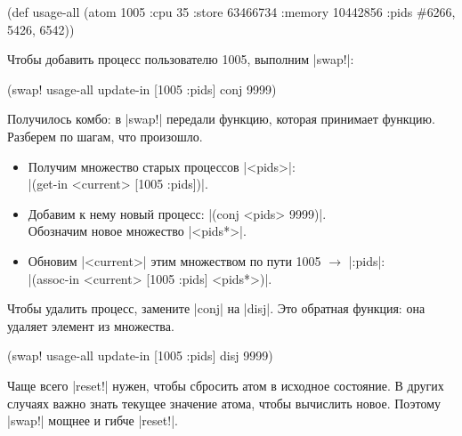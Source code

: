 \begin{english}
  \begin{clojure}
(def usage-all
  (atom {1005 {:cpu 35
               :store 63466734
               :memory 10442856
               :pids #{6266, 5426, 6542}}}))
  \end{clojure}
\end{english}

Чтобы добавить процесс пользователю 1005, выполним \spverb|swap!|:

\begin{english}
  \begin{clojure}
(swap! usage-all update-in [1005 :pids] conj 9999)
  \end{clojure}
\end{english}

Получилось комбо: в \spverb|swap!| передали функцию, которая принимает
функцию. Разберем по шагам, что произошло.

\begin{itemize}

\item
  Получим множество старых процессов \spverb|<pids>|:\\
  \spverb|(get-in <current> [1005 :pids])|.

\item
  Добавим к нему новый процесс: \spverb|(conj <pids> 9999)|.\\
  Обозначим новое множество \spverb|<pids*>|.

\item
  Обновим \spverb|<current>| этим множеством по пути 1005 $\to$ \spverb|:pids|:\\
  \spverb|(assoc-in <current> [1005 :pids] <pids*>)|.

\end{itemize}

Чтобы удалить процесс, замените \spverb|conj| на \spverb|disj|. Это обратная
функция: она удаляет элемент из множества.

\begin{english}
  \begin{clojure}
(swap! usage-all update-in [1005 :pids] disj 9999)
  \end{clojure}
\end{english}

Чаще всего \spverb|reset!| нужен, чтобы сбросить атом в исходное состояние. В
других случаях важно знать текущее значение атома, чтобы вычислить
новое. Поэтому \spverb|swap!| мощнее и гибче \spverb|reset!|.

